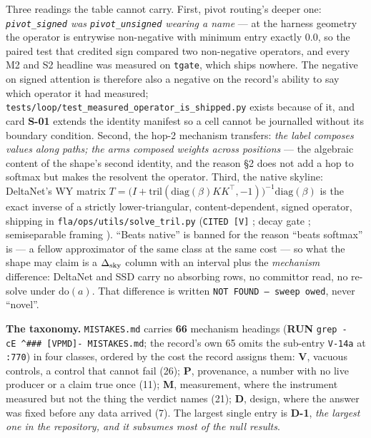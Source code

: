 \documentclass[11pt,a4paper]{article}
\theoremstyle{plain}
\theoremstyle{definition}
\theoremstyle{remark}
\begin{document}
Three readings the table cannot carry. First, pivot routing's deeper
one: \emph{\texttt{pivot\_signed} was \texttt{pivot\_unsigned} wearing a
name} --- at the harness geometry the operator is entrywise non-negative
with minimum entry exactly \(0.0\), so the paired test that credited
sign compared two non-negative operators, and every M2 and S2 headline
was measured on \texttt{tgate}, which ships nowhere. The negative on
signed attention is therefore also a negative on the record's ability to
say which operator it had measured;
\texttt{tests/loop/test\_measured\_operator\_is\_shipped.py} exists
because of it, and card \textbf{S-01} extends the identity manifest so a
cell cannot be journalled without its boundary condition. Second, the
hop-2 mechanism transfers: \emph{the label composes values along paths;
the arms composed weights across positions} --- the algebraic content of
the shape's second identity, and the reason §2 does not add a hop to
softmax but makes the resolvent the operator. Third, the native skyline:
DeltaNet's WY matrix
\(T=\big(I+\mathrm{tril}(\mathrm{diag}(\beta)KK^{\top},-1)\big)^{-1}\mathrm{diag}(\beta)\)
is the exact inverse of a strictly lower-triangular, content-dependent,
signed operator, shipping in \texttt{fla/ops/utils/solve\_tril.py}
(\texttt{CITED\ {[}V{]}} \citep{yang-2024-deltanet}; decay gate
\citep{yang-2024-gateddeltanet}; semiseparable framing
\citep{dao-2024-ssd}). ``Beats native'' is banned for the reason ``beats
softmax'' is --- a fellow approximator of the same class at the same
cost --- so what the shape may claim is a \(\Delta_{\rm sky}\) column
with an interval plus the \emph{mechanism} difference: DeltaNet and SSD
carry no absorbing rows, no committor read, no re-solve under
\(\mathrm{do}(a)\). That difference is written
\texttt{NOT\ FOUND\ —\ sweep\ owed}, never ``novel''.

\textbf{The taxonomy.} \texttt{MISTAKES.md} carries \textbf{66}
mechanism headings (\textbf{RUN}
\texttt{grep\ -cE\ \textquotesingle{}\^{}\#\#\#\ {[}VPMD{]}-\textquotesingle{}\ MISTAKES.md};
the record's own 65 omits the sub-entry \texttt{V-14a} at \texttt{:770})
in four classes, ordered by the cost the record assigns them:
\textbf{V}, vacuous controls, a control that cannot fail (26);
\textbf{P}, provenance, a number with no live producer or a claim true
once (11); \textbf{M}, measurement, where the instrument measured but
not the thing the verdict names (21); \textbf{D}, design, where the
answer was fixed before any data arrived (7). The largest single entry
is \textbf{D-1}, \emph{the largest one in the repository, and it
subsumes most of the null results}.
\end{document}
